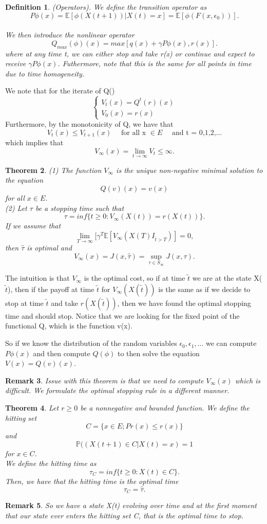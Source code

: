 \documentclass[twoside]{article}
\newcounter{lecnum}
\newtheorem{theorem}{Theorem}[lecnum]
\newtheorem{remark}[theorem]{Remark}
\newtheorem{definition}[theorem]{Definition}
\begin{document}
\begin{definition}(Operators). We define the transition operator as 
$$
P\phi(x) = \mathbb{E}[\phi(X(t+1))|X(t)=x] = \mathbb{E}[\phi(F(x,\epsilon_0))].
$$\\
We then introduce the nonlinear operator 
$$
Q_{max}(\phi)(x) = max[q(x) + \gamma P\phi(x), r(x)].
$$
where at any time t, we can either stop and take r(x) or continue and expect to receive $\gamma P\phi(x)$. Futhermore, note that this is the same for all points in time due to time homogeneity.
\end{definition}
We note that for the iterate of Q() 
$$
\begin{cases}
V_t(x) = Q^t(r)(x)\\
V_0(x) = r(x)
\end{cases}
$$
Furthermore, by the monotonicity of Q, we have that 
$$
V_t(x) \leq V_{t+1}(x) \quad \text{ for all x } \in E \quad \text{ and t = 0,1,2,...}
$$
which implies that 
$$
V_{\infty}(x) = \lim_{t \rightarrow \infty}V_{t} \leq \infty.
$$
\newpage
\begin{theorem}(1) The function $V_{\infty}$ is the unique non-negative minimal solution to the equation 
$$
Q(v)(x) = v(x)
$$
for all $x \in E$.\\
(2) Let $\tau$ be a stopping time such that 
$$
\tau = inf\{t \geq 0: V_{\infty}(X(t)) = r(X(t))\}.
$$
If we assume that 
$$
\lim_{T \rightarrow \infty}[\gamma^T\mathbb{E}[V_{\infty}(X(T)I_{\hat{t} > T})] = 0,
$$
then $\hat{\tau}$ is optimal and 
$$
V_{\infty}(x) = J(x,\hat{\tau}) = \sup_{\tau \in S_{\infty}}J(x,\tau).
$$
\end{theorem}
The intuition is that $V_{\infty}$ is the optimal cost, so if at time $\tilde{t}$ we are at the state X($\tilde{t}$), then if the payoff at time $\tilde{t}$ for $V_{\infty}(X(\tilde{t}))$ is the same as if we decide to stop at time $\tilde{t}$ and take $r(X(\tilde{t}))$, then we have found the optimal stopping time and should stop. Notice that we are looking for the fixed point of the functional Q, which is the function v(x).

So if we know the distribution of the random variables $\epsilon_0,\epsilon_1,...$ we can compute $P\phi(x)$ and then compute $Q(\phi)$ to then solve the equation $V(x) = Q(v)(x)$.

\begin{remark}Issue with this theorem is that we need to compute $V_{\infty}(x)$ which is difficult. We formulate the optimal stopping rule in a different manner.
\end{remark}
\begin{theorem} Let $r \geq 0$ be a nonnegative and bounded function. We define the hitting set
$$
C = \{x \in E; Pr(x) \leq r(x)\}
$$
and 
$$
\mathbb{P}((X(t+1) \in C|X(t)=x) = 1
$$
for $x \in C$. \\We define the hitting time as 
$$
\tau_C = inf\{t \geq 0: X(t) \in C\}.
$$
Then, we have that the hitting time is the optimal time
$$
\tau_C = \hat{\tau}.
$$
\end{theorem}

\begin{remark}So we have a state X(t) evolving over time and at the first moment that our state ever enters the hitting set C, that is the optimal time to stop.
\end{remark}
\end{document}
